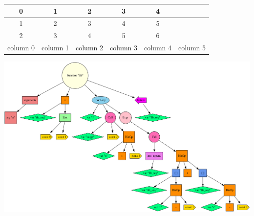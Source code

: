 \documentclass[12pt]{article}
\begin{document}
 
\begin{tabular}{ |c|c|c|c|c|c| } 
\hline 
0 & 1 & 2 & 3 & 4 \\
\hline 
1 & 2 & 3 & 4 & 5 \\
\hline 
2 & 3 & 4 & 5 & 6 \\
\hline 
column 0 & column 1 & column 2 & column 3 & column 4 & column 5 \\
\hline 
\end{tabular}



\includegraphics[scale=0.1]{ast.png} 
\end{document}
